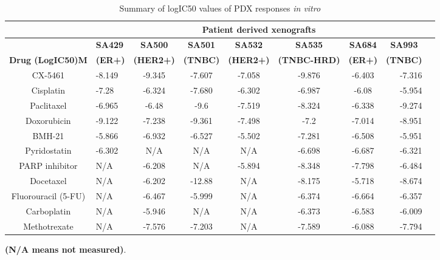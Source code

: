  \begin{table}[htbp]
   \centering
   \caption{Summary of logIC50 values of PDX responses \textit{in vitro}}
     \begin{tabular}{|c|p{5em}|c|c|c|c|c|r|r|}
        \hline
       & \multicolumn{7}{|c|}{\textbf{Patient derived xenografts}} \\
          \hline
       & \textbf{SA429} & \textbf{SA500} & \textbf{SA501} & \textbf{SA532} & \textbf{SA535} & \multicolumn{1}{|c|}{\textbf{SA684}} & \multicolumn{1}{|c|}{\textbf{SA993}}\\
     \multicolumn{1}{|l|}{\textbf{Drug (LogIC50)M}} & \textbf{(ER+)} & \textbf{(HER2+)} & \textbf{(TNBC)} & \textbf{(HER2+)} & \textbf{(TNBC-HRD)} & \multicolumn{1}{|c|}{\textbf{(ER+)}} & \multicolumn{1}{|c|}{\textbf{(TNBC)}} \\
        \hline
     CX-5461  & -8.149 & -9.345 & -7.607 & -7.058 & -9.876 & -6.403 & -7.316 \\
     Cisplatin  & -7.28 & -6.324 & -7.680 & -6.302 & -6.987 & -6.08 & -5.954 \\
     Paclitaxel  & -6.965 & -6.48 & -9.6 & -7.519 & -8.324 & -6.338 & -9.274 \\
     Doxorubicin  & -9.122 & -7.238 & -9.361 & -7.498 & -7.2 & -7.014 & -8.951 \\
     BMH-21  & -5.866 & -6.932 & -6.527 & -5.502 & -7.281 & -6.508 & -5.951 \\
     Pyridostatin & -6.302 & N/A & N/A & N/A & -6.698 & -6.687 & -6.321 \\
     PARP inhibitor  & N/A & -6.208 & N/A & -5.894 & -8.348 & -7.798 & -6.484 \\
     Docetaxel  & N/A & -6.202 & -12.88 & N/A & -8.175 & -5.718 & -8.674 \\
     Fluorouracil (5-FU)  & N/A & -6.467 & -5.999 & N/A & -6.374 & -6.664 & -6.357 \\
     Carboplatin  & N/A & -5.946 & N/A & N/A & -6.373 & -6.583 & -6.009 \\
     Methotrexate  & N/A & -7.576 & -7.203 & N/A & -7.589 & -6.088 & -7.794 \\
    
     \hline
     \end{tabular}%
   \label{tab:invitroIC50}%
   
   
    \small\textbf{ (N/A means not measured)}.
 \end{table}%

